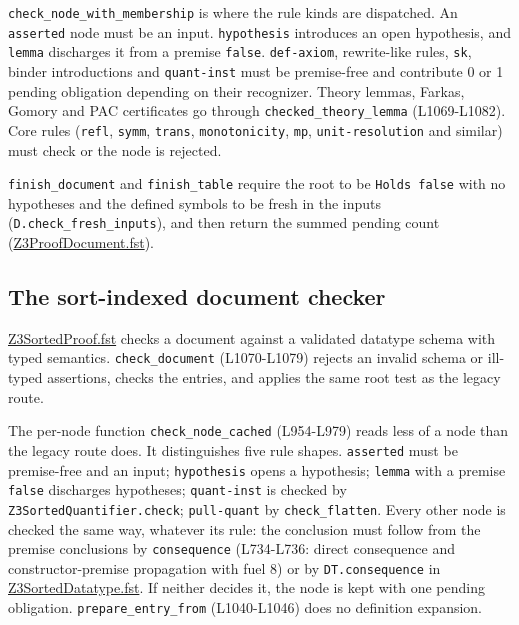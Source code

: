 \documentclass[10pt,a4paper]{article}
\begin{document}
\texttt{check\_\allowbreak{}node\_\allowbreak{}with\_\allowbreak{}membership} is where the rule kinds are dispatched. An \texttt{asserted} node must be an input. \texttt{hypothesis} introduces an open hypothesis, and \texttt{lemma} discharges it from a premise \texttt{false}. \texttt{def-{}\allowbreak{}axiom}, rewrite-like rules, \texttt{sk}, binder introductions and \texttt{quant-{}\allowbreak{}inst} must be premise-free and contribute 0 or 1 pending obligation depending on their recognizer. Theory lemmas, Farkas, Gomory and PAC certificates go through \texttt{checked\_\allowbreak{}theory\_\allowbreak{}lemma} (L1069-L1082). Core rules (\texttt{refl}, \texttt{symm}, \texttt{trans}, \texttt{monotonicity}, \texttt{mp}, \texttt{unit-{}\allowbreak{}resolution} and similar) must check or the node is rejected.

\texttt{finish\_\allowbreak{}document} and \texttt{finish\_\allowbreak{}table} require the root to be \texttt{Holds false} with no hypotheses and the defined symbols to be fresh in the inputs (\texttt{D.\allowbreak{}check\_\allowbreak{}fresh\_\allowbreak{}inputs}), and then return the summed pending count (\href{https://github.com/Z3Prover/z3/blob/8fbb275aba0472e862e289c7af1331b3bd5d512c/fstar/Z3ProofDocument.fst\#L520-L532}{Z3Proof\allowbreak{}Document.\allowbreak{}fst}).

\subsection{The sort-indexed document checker}\label{sec:35-the-sort-indexed-document-checker}

\href{https://github.com/Z3Prover/z3/blob/8fbb275aba0472e862e289c7af1331b3bd5d512c/fstar/Z3SortedProof.fst}{Z3Sorted\allowbreak{}Proof.\allowbreak{}fst} checks a document against a validated datatype schema with typed semantics. \texttt{check\_\allowbreak{}document} (L1070-L1079) rejects an invalid schema or ill-typed assertions, checks the entries, and applies the same root test as the legacy route.

The per-node function \texttt{check\_\allowbreak{}node\_\allowbreak{}cached} (L954-L979) reads less of a node than the legacy route does. It distinguishes five rule shapes. \texttt{asserted} must be premise-free and an input; \texttt{hypothesis} opens a hypothesis; \texttt{lemma} with a premise \texttt{false} discharges hypotheses; \texttt{quant-{}\allowbreak{}inst} is checked by \texttt{Z3SortedQuantifi\allowbreak{}er.\allowbreak{}check}; \texttt{pull-{}\allowbreak{}quant} by \texttt{check\_\allowbreak{}flatten}. Every other node is checked the same way, whatever its rule: the conclusion must follow from the premise conclusions by \texttt{consequence} (L734-L736: direct consequence and constructor-premise propagation with fuel 8) or by \texttt{DT.\allowbreak{}consequence} in \href{https://github.com/Z3Prover/z3/blob/8fbb275aba0472e862e289c7af1331b3bd5d512c/fstar/Z3SortedDatatype.fst}{Z3Sorted\allowbreak{}Datatype.\allowbreak{}fst}. If neither decides it, the node is kept with one pending obligation. \texttt{prepare\_\allowbreak{}entry\_\allowbreak{}from} (L1040-L1046) does no definition expansion.
\end{document}
